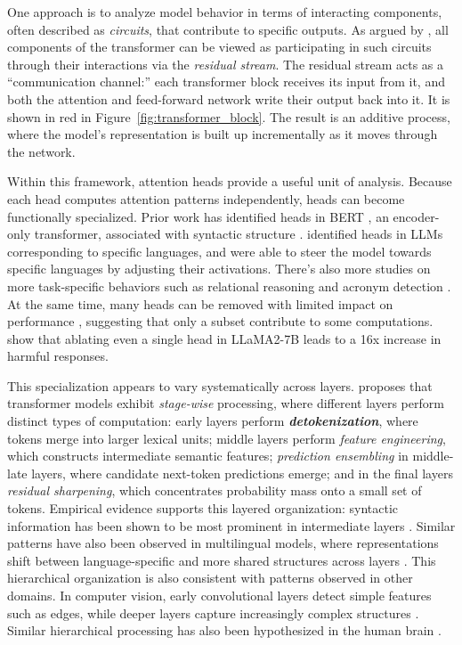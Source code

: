 One approach is to analyze model behavior in terms of interacting components, often described as \textit{circuits}, that contribute to specific outputs. As argued by \citet{elhage2021}, all components of the transformer can be viewed as participating in such circuits through their interactions via the \textit{residual stream}. The residual stream acts as a ``communication channel:'' each transformer block receives its input from it, and both the attention and feed-forward network write their output back into it. It is shown in red in Figure~\ref{fig:transformer_block}. The result is an additive process, where the model's representation is built up incrementally as it moves through the network.

Within this framework, attention heads provide a useful unit of analysis. Because each head computes attention patterns independently, heads can become functionally specialized. Prior work has identified heads in BERT \citep{devlin2019}, an encoder-only transformer, associated with syntactic structure \citep{clark2019}. \citet{liu2025} identified heads in LLMs corresponding to specific languages, and were able to steer the model towards specific languages by adjusting their activations. There's also more studies on more task-specific behaviors such as relational reasoning \citep{hanna2023} and acronym detection \citep{carrasco2024}. At the same time, many heads can be removed with limited impact on performance \citep{voita2019, michel2019}, suggesting that only a subset contribute to some computations. \citet{zhou2025} show that ablating even a single head in LLaMA2-7B leads to a 16x increase in harmful responses.

This specialization appears to vary systematically across layers. \citet{lad2024} proposes that transformer models exhibit \textit{stage-wise} processing, where different layers perform distinct types of computation: early layers perform \textit{\textbf{detokenization}}, where tokens merge into larger lexical units; middle layers perform \textit{feature engineering}, which constructs intermediate semantic features; \textit{prediction ensembling} in middle-late layers, where candidate next-token predictions emerge; and in the final layers \textit{residual sharpening}, which concentrates probability mass onto a small set of tokens. Empirical evidence supports this layered organization: syntactic information has been shown to be most prominent in intermediate layers \citep{vig2019}. Similar patterns have also been observed in multilingual models, where representations shift between language-specific and more shared structures across layers \citep{conneau2020, wendler2024}. This hierarchical organization is also consistent with patterns observed in other domains. In computer vision, early convolutional layers detect simple features such as edges, while deeper layers capture increasingly complex structures \citep{zeiler2014, jastrzebski2018}. Similar hierarchical processing has also been hypothesized in the human brain \citep{wacongne2011}.

